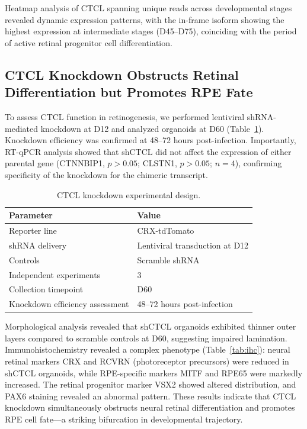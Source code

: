 \documentclass[12pt]{article}
\begin{document}
Heatmap analysis of CTCL spanning unique reads across developmental stages revealed dynamic expression patterns, with the in-frame isoform showing the highest expression at intermediate stages (D45--D75), coinciding with the period of active retinal progenitor cell differentiation.

\subsection{CTCL Knockdown Obstructs Retinal Differentiation but Promotes RPE Fate}

To assess CTCL function in retinogenesis, we performed lentiviral shRNA-mediated knockdown at D12 and analyzed organoids at D60 (Table~\ref{tab:knockdown_design}). Knockdown efficiency was confirmed at 48--72 hours post-infection. Importantly, RT-qPCR analysis showed that shCTCL did not affect the expression of either parental gene (CTNNBIP1, $p > 0.05$; CLSTN1, $p > 0.05$; $n = 4$), confirming specificity of the knockdown for the chimeric transcript.

\begin{table}[htbp]
\centering
\caption{CTCL knockdown experimental design.}
\label{tab:knockdown_design}
\begin{tabular}{ll}
\toprule
Parameter & Value \\
\midrule
Reporter line & CRX-tdTomato \\
shRNA delivery & Lentiviral transduction at D12 \\
Controls & Scramble shRNA \\
Independent experiments & 3 \\
Collection timepoint & D60 \\
Knockdown efficiency assessment & 48--72 hours post-infection \\
\bottomrule
\end{tabular}
\end{table}

Morphological analysis revealed that shCTCL organoids exhibited thinner outer layers compared to scramble controls at D60, suggesting impaired lamination. Immunohistochemistry revealed a complex phenotype (Table~\ref{tab:ihc}): neural retinal markers CRX and RCVRN (photoreceptor precursors) were reduced in shCTCL organoids, while RPE-specific markers MITF and RPE65 were markedly increased. The retinal progenitor marker VSX2 showed altered distribution, and PAX6 staining revealed an abnormal pattern. These results indicate that CTCL knockdown simultaneously obstructs neural retinal differentiation and promotes RPE cell fate---a striking bifurcation in developmental trajectory.
\end{document}
